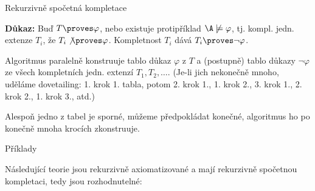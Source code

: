 \documentclass{beamer}
\begin{document}
\begin{frame}{Rekurzivně spočetná kompletace}

    \pause
     
    \pause
    
    \pause
    \textbf{Důkaz:} \pause
    Buď $T\proves\varphi$, nebo existuje protipříklad $\A\not\models\varphi$, tj. kompl. jedn. extenze $T_i$, že $T_i\not\proves\varphi$. Kompletnost $T_i$ dává $T_i\proves\neg\varphi$. 
    
    \pause
    Algoritmus paralelně konstruuje tablo důkaz $\varphi$ z $T$ a (postupně) tablo důkazy $\neg\varphi$ ze všech kompletních jedn. extenzí $T_1,T_2,\dots$. (Je-li jich nekonečně mnoho, uděláme \alert{dovetailing}: 1. krok 1. tabla, potom 2. krok 1., 1. krok 2., 3. krok 1., 2. krok 2., 1. krok 3., atd.)
    
    \pause
    Alespoň jedno z tabel je sporné, můžeme předpokládat konečné, algoritmus ho po konečně mnoha krocích zkonstruuje.
    \hfill\qedsymbol

\end{frame}


\begin{frame}{Příklady}
    
    Následující teorie jsou rekurzivně axiomatizované a mají rekurzivně spočetnou kompletaci, tedy jsou rozhodnutelné:


\end{frame}
\end{document}

